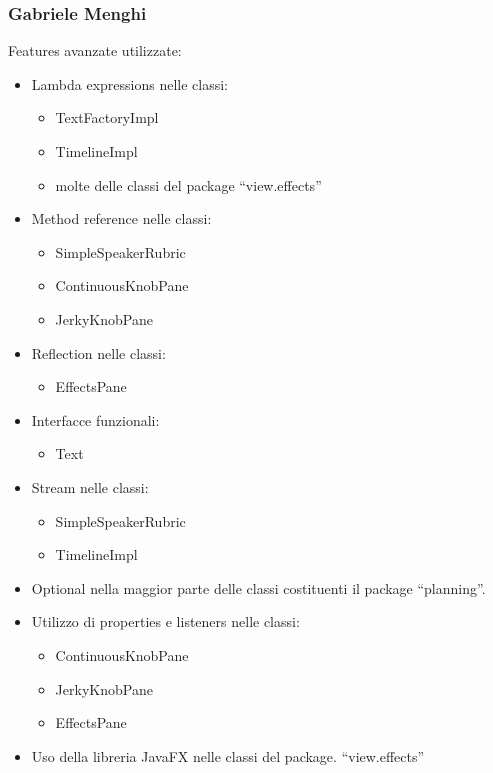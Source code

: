 \documentclass[a4paper,12pt]{report}
\begin{document}
\subsubsection{Gabriele Menghi}
Features avanzate utilizzate:
\begin{itemize}
    \item Lambda expressions nelle classi:
    \begin{itemize}
        \item TextFactoryImpl
        \item TimelineImpl
        \item molte delle classi del package “view.effects”
    \end{itemize}
    \item Method reference nelle classi:
    \begin{itemize}
        \item SimpleSpeakerRubric
        \item ContinuousKnobPane
        \item JerkyKnobPane
    \end{itemize}   
    \item Reflection nelle classi:
    \begin{itemize}
        \item EffectsPane
    \end{itemize}
    \item Interfacce funzionali:
    \begin{itemize}
        \item Text
    \end{itemize}
    \item Stream nelle classi:
    \begin{itemize}
        \item SimpleSpeakerRubric
        \item TimelineImpl
    \end{itemize}
    \item Optional nella maggior parte delle classi costituenti il package “planning”.
    \item Utilizzo di properties e listeners nelle classi:
    \begin{itemize}
        \item ContinuousKnobPane
        \item JerkyKnobPane
        \item EffectsPane
    \end{itemize}
    \item Uso della libreria JavaFX nelle classi del package. “view.effects”
\end{itemize}
\end{document}
